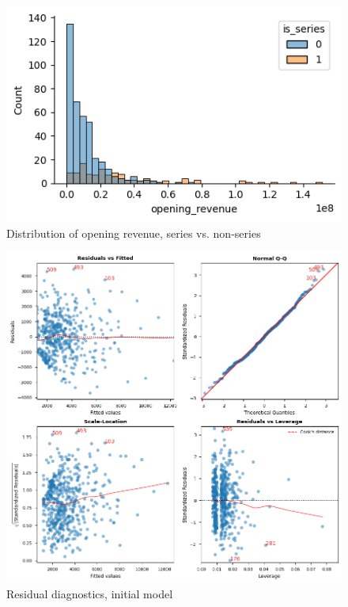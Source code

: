 \documentclass[10pt]{article}
\begin{document}
\begin{figure}[H]
	\begin{center}
		\centerline{\includegraphics[scale=0.6]{is_series}}
		\caption{Distribution of opening revenue, series vs. non-series}
	\end{center}
\end{figure}

\begin{figure}[H]
	\begin{center}
		\centerline{\includegraphics[scale=0.4]{initial_diagnostics}}
		\caption{Residual diagnostics, initial model}
	\end{center}
\end{figure}
\end{document}
